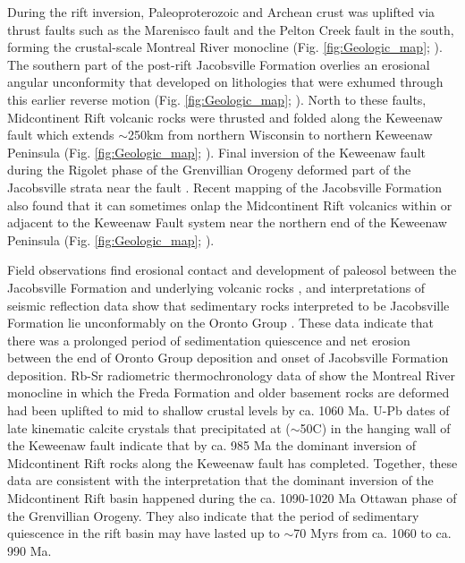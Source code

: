 \documentclass[draft]{agujournal2019}
\begin{document}
During the rift inversion, Paleoproterozoic and Archean crust was uplifted via thrust faults such as the Marenisco fault and the Pelton Creek fault in the south, forming the crustal-scale Montreal River monocline (Fig. \ref{fig:Geologic_map}; ). The southern part of the post-rift Jacobsville Formation overlies an erosional angular unconformity that developed on lithologies that were exhumed through this earlier reverse motion (Fig. \ref{fig:Geologic_map}; ). North to these faults, Midcontinent Rift volcanic rocks were thrusted and folded along the Keweenaw fault which extends $\sim$250km from northern Wisconsin to northern Keweenaw Peninsula (Fig. \ref{fig:Geologic_map}; ). Final inversion of the Keweenaw fault during the Rigolet phase of the Grenvillian Orogeny deformed part of the Jacobsville strata near the fault \cite{Hodgin2022a}. Recent mapping of the Jacobsville Formation also found that it can sometimes onlap the Midcontinent Rift volcanics within or adjacent to the Keweenaw Fault system near the northern end of the Keweenaw Peninsula (Fig. \ref{fig:Geologic_map}; ). 

Field observations find erosional contact and development of paleosol between the Jacobsville Formation and underlying volcanic rocks \cite{Hamblin1958a, Kalliokoski1975a}, and interpretations of seismic reflection data show that sedimentary rocks interpreted to be Jacobsville Formation lie unconformably on the Oronto Group \cite{Cannon1989a}. These data indicate that there was a prolonged period of sedimentation quiescence and net erosion between the end of Oronto Group deposition and onset of Jacobsville Formation deposition. Rb-Sr radiometric thermochronology data of  show the Montreal River monocline in which the Freda Formation and older basement rocks are deformed had been uplifted to mid to shallow crustal levels by ca. 1060 Ma. U-Pb dates of late kinematic calcite crystals that precipitated at ($\sim$50\textdegree C) in the hanging wall of the Keweenaw fault \cite{Hodgin2022a} indicate that by ca. 985 Ma the dominant inversion of Midcontinent Rift rocks along the Keweenaw fault has completed. Together, these data are consistent with the interpretation that the dominant inversion of the Midcontinent Rift basin happened during the ca. 1090-1020 Ma Ottawan phase of the Grenvillian Orogeny. They also indicate that the period of sedimentary quiescence in the rift basin may have lasted up to $\sim$70 Myrs from ca. 1060 to ca. 990 Ma. 
\end{document}
